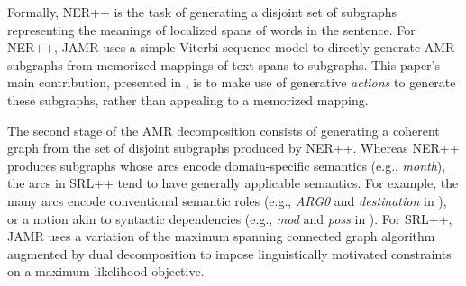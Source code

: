\documentclass[11pt]{article}
\newcommand\e[1]{\textit{#1}} %
\begin{document}
Formally, NER++ is the task of generating a disjoint set of subgraphs representing the meanings of localized spans of words in the sentence.
For NER++, JAMR uses a simple Viterbi sequence model to directly generate AMR-subgraphs from memorized mappings of text spans to subgraphs.
This paper's main contribution, presented in , is
  to make use of generative \textit{actions} to generate these subgraphs, rather than appealing
  to a memorized mapping.


The second stage of the AMR decomposition consists of generating a coherent graph
  from the set of disjoint subgraphs produced by NER++.
Whereas NER++ produces subgraphs whose arcs encode domain-specific semantics
  (e.g., \textit{month}), 
  the arcs in SRL++ tend to have generally applicable semantics.
For example, the many arcs encode conventional semantic roles 
  (e.g., \e{ARG0} and \e{destination} in ),
  or a notion akin to syntactic dependencies (e.g., \e{mod} and \e{poss} in ).
For SRL++, JAMR uses a variation of the maximum spanning connected graph algorithm augmented by dual decomposition to impose linguistically motivated constraints on a maximum likelihood objective. 
\end{document}
